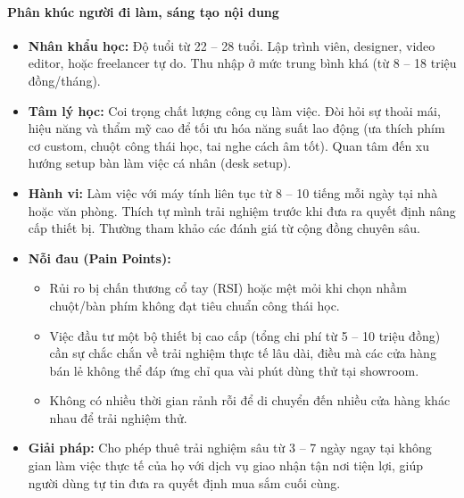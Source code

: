 \paragraph{Phân khúc người đi làm, sáng tạo nội dung}
\begin{itemize}
    \item \textbf{Nhân khẩu học:} Độ tuổi từ 22 -- 28 tuổi. Lập trình viên, designer, video editor, hoặc freelancer tự do. Thu nhập ở mức trung bình khá (từ 8 -- 18 triệu đồng/tháng).
    \item \textbf{Tâm lý học:} Coi trọng chất lượng công cụ làm việc. Đòi hỏi sự thoải mái, hiệu năng và thẩm mỹ cao để tối ưu hóa năng suất lao động (ưa thích phím cơ custom, chuột công thái học, tai nghe cách âm tốt). Quan tâm đến xu hướng setup bàn làm việc cá nhân (desk setup).
    \item \textbf{Hành vi:} Làm việc với máy tính liên tục từ 8 -- 10 tiếng mỗi ngày tại nhà hoặc văn phòng. Thích tự mình trải nghiệm trước khi đưa ra quyết định nâng cấp thiết bị. Thường tham khảo các đánh giá từ cộng đồng chuyên sâu.
    \item \textbf{Nỗi đau (Pain Points):}
    \begin{itemize}
        \item Rủi ro bị chấn thương cổ tay (RSI) hoặc mệt mỏi khi chọn nhầm chuột/bàn phím không đạt tiêu chuẩn công thái học.
        \item Việc đầu tư một bộ thiết bị cao cấp (tổng chi phí từ 5 -- 10 triệu đồng) cần sự chắc chắn về trải nghiệm thực tế lâu dài, điều mà các cửa hàng bán lẻ không thể đáp ứng chỉ qua vài phút dùng thử tại showroom.
        \item Không có nhiều thời gian rảnh rỗi để di chuyển đến nhiều cửa hàng khác nhau để trải nghiệm thử.
    \end{itemize}
    \item \textbf{Giải pháp:} Cho phép thuê trải nghiệm sâu từ 3 -- 7 ngày ngay tại không gian làm việc thực tế của họ với dịch vụ giao nhận tận nơi tiện lợi, giúp người dùng tự tin đưa ra quyết định mua sắm cuối cùng.
\end{itemize}

